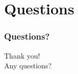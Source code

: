 \section{Questions}
\begin{frame}
  \frametitle{Questions?}
  Thank you!\\
  Any questions?
\end{frame}
